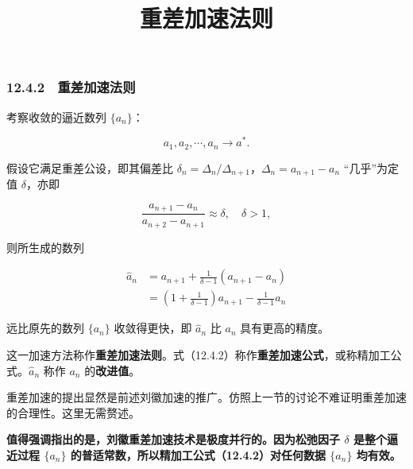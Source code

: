 \documentclass[
  10pt,
  fontset=fandol]{ctexart}
\title{重差加速法则}
\author{}
\date{}
\begin{document}
\maketitle

\subsubsection{12.4.2　重差加速法则}\label{ux91cdux5deeux52a0ux901fux6cd5ux5219}

考察收敛的逼近数列 \(\{a_n\}\)：

\[
a_1,a_2,\cdots,a_n\to a^*.
\]

假设它满足重差公设，即其偏差比 \(\delta_n=\Delta_n/\Delta_{n+1}\)，\(\Delta_n=a_{n+1}-a_n\) ``几乎''为定值 \(\delta\)，亦即

\[
\frac{a_{n+1}-a_n}{a_{n+2}-a_{n+1}}\approx\delta,\quad\delta>1,
\tag{12.4.1}
\]

则所生成的数列

\[
\begin{aligned}
\widehat a_n&=a_{n+1}+\frac{1}{\delta-1}(a_{n+1}-a_n)\\
&=\left(1+\frac{1}{\delta-1}\right)a_{n+1}-\frac{1}{\delta-1}a_n
\end{aligned}
\tag{12.4.2}
\]

远比原先的数列 \(\{a_n\}\) 收敛得更快，即 \(\widehat a_n\) 比 \(a_n\) 具有更高的精度。

这一加速方法称作\textbf{重差加速法则}。式（12.4.2）称作\textbf{重差加速公式}，或称精加工公式。\(\widehat a_n\) 称作 \(a_n\) 的\textbf{改进值}。

重差加速的提出显然是前述刘徽加速的推广。仿照上一节的讨论不难证明重差加速的合理性。这里无需赘述。

\textbf{值得强调指出的是，刘徽重差加速技术是极度并行的。因为松弛因子 \(\delta\) 是整个逼近过程 \(\{a_n\}\) 的普适常数，所以精加工公式（12.4.2）对任何数据 \(\{a_n\}\) 均有效。}
\end{document}
